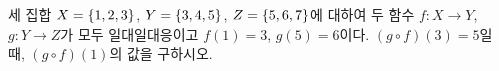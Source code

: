 세 집합 $X=\{1{,}\mkern3mu\mathopen{}2{,}\mkern3mu\mathopen{}3\}$, $Y=\{3{,}\mkern3mu\mathopen{}4{,}\mkern3mu\mathopen{}5\}$, $Z=\{5{,}\mkern3mu\mathopen{}6{,}\mkern3mu\mathopen{}7\}$에 대하여 두 함수 $f:X\longrightarrow Y$, $g:Y\longrightarrow Z$가 모두 일대일대응이고 $f(1)=3$, $g(5)=6$이다. $(g\circ f)(3)=5$일 때, $(g\circ f)(1)$의 값을 구하시오.
